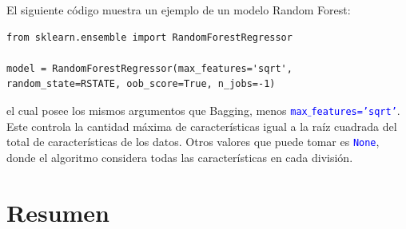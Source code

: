 \documentclass[a4paper, 12pt]{book}
\begin{document}
El siguiente código muestra un ejemplo de un modelo Random Forest:
\begin{verbatim}
from sklearn.ensemble import RandomForestRegressor

model = RandomForestRegressor(max_features='sqrt', random_state=RSTATE, oob_score=True, n_jobs=-1)
\end{verbatim}
el cual posee los mismos argumentos que Bagging, menos \texttt{\textcolor{blue}{max$\_$features='sqrt'}}. Este controla la cantidad máxima de características igual a la raíz cuadrada del total de características de los datos. Otros valores que puede tomar es \texttt{\textcolor{blue}{None}}, donde el algoritmo considera todas las características en cada división.

\newpage
\section{Resumen}
\end{document}
